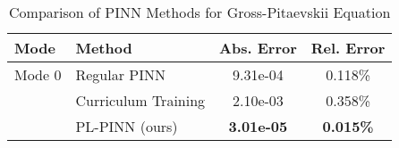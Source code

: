 \begin{table}[htbp]
\centering
\caption{Comparison of PINN Methods for Gross-Pitaevskii Equation}
\label{tab:pinn_comparison}
\begin{tabular}{llcc}
\toprule
Mode & Method & Abs. Error & Rel. Error \\
\midrule
Mode 0 & Regular PINN & 9.31e-04 & 0.118\% \\
 & Curriculum Training & 2.10e-03 & 0.358\% \\
 & PL-PINN (ours) & \textbf{3.01e-05} & \textbf{0.015\%} \\
\bottomrule
\end{tabular}
\end{table}